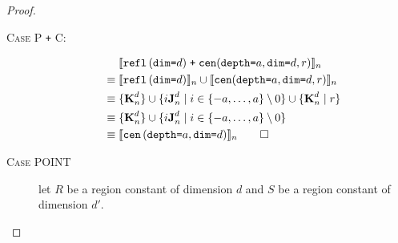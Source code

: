 \begin{proof}
\begin{description}
%
  \item[\textsc{Case P \texttt{+} C}:]
    \begin{align*}
      & \; \interp{\stenReflS{d} \; \texttt{+} \; \stenCenSR{a}{d}{r}}_{n} \\
      \equiv & \; \interp{\stenReflS{d}}_{n} \cup \interp{\stenCenSR{a}{d}{r}}_{n} \\
      \equiv & \; \{\zeroEntry{d}{n}\} \cup
                  \{i\singleEntry{d}{n} \mid i \in \{-a, \ldots, a\}
               \setminus 0 \} \cup
                  \{\zeroEntry{d}{n} \mid r \} \\
      \equiv & \; \{\zeroEntry{d}{n}\} \cup
                  \{i\singleEntry{d}{n} \mid i \in \{-a, \ldots, a\}
               \setminus 0 \} \\
      \equiv & \; \interp{\stenCenS{a}{d}}_n \qed
    \end{align*}
  \item[\textsc{Case POINT}]
   let $R$ be a region constant of dimension $d$ and $S$ be a region
   constant of dimension $d'$. \\


\end{description}
\end{proof}
